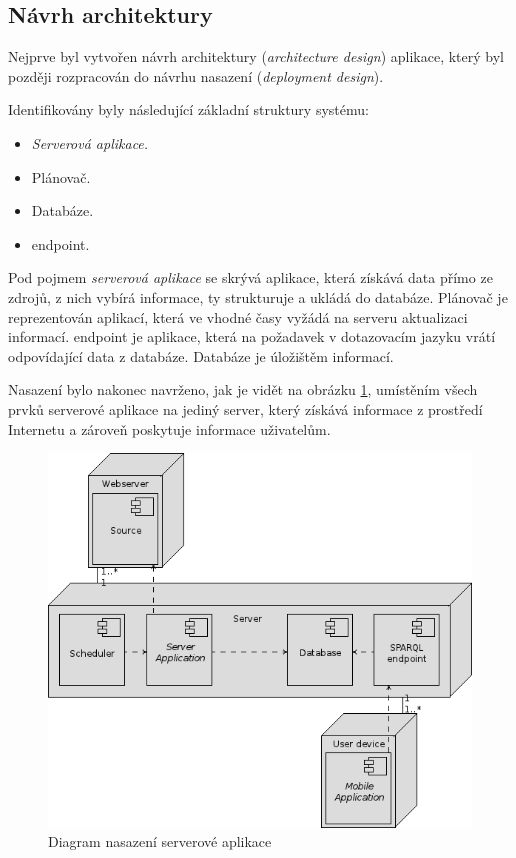 \subsection{Návrh architektury}
Nejprve byl vytvořen návrh architektury (\textit{architecture design}) aplikace, který byl později rozpracován do návrhu nasazení (\textit{deployment design}).

Identifikovány byly následující základní struktury systému:
\begin{itemize}
 \item \textit{Serverová aplikace.}
 \item Plánovač.
 \item Databáze.
 \item {} endpoint.
\end{itemize}
Pod pojmem \textit{serverová aplikace} se skrývá aplikace, která získává data přímo ze zdrojů, z nich vybírá informace, ty strukturuje a ukládá do databáze. Plánovač je reprezentován aplikací, která ve vhodné časy vyžádá na serveru aktualizaci informací.  endpoint je aplikace, která na požadavek v dotazovacím jazyku vrátí odpovídající data z databáze. Databáze je úložištěm informací.

Nasazení bylo nakonec navrženo, jak je vidět na obrázku \ref{fig:server:deployment}, umístěním všech prvků serverové aplikace na jediný server, který získává informace z prostředí Internetu a zároveň poskytuje informace uživatelům.
\begin{figure}[h]
 \centering
 \includegraphics{./figures/deployment-s.png}
 \caption{Diagram nasazení serverové aplikace}
 \label{fig:server:deployment}
\end{figure}


